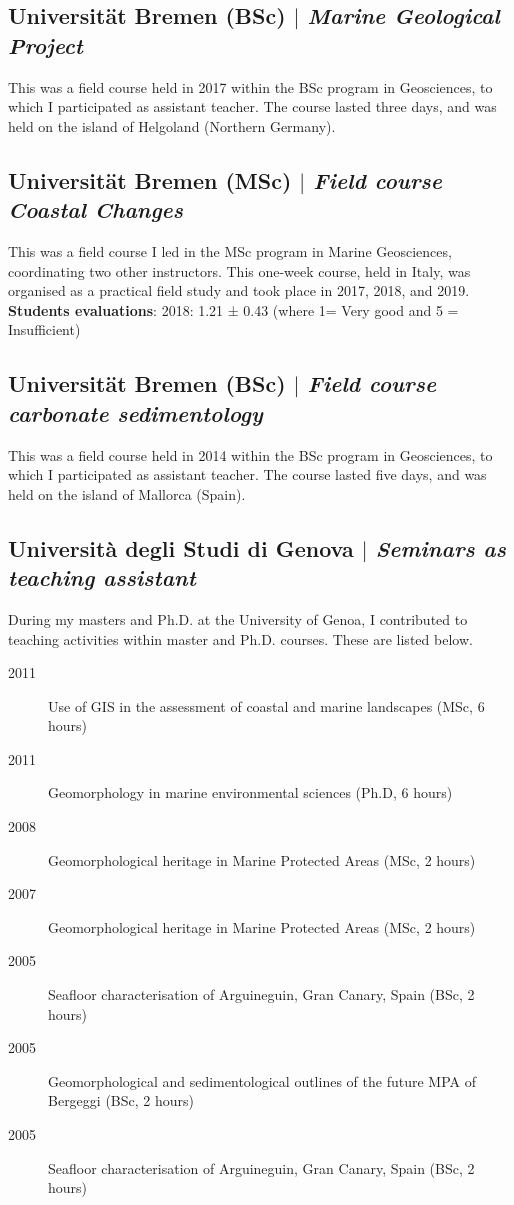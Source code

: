 \documentclass[11pt]{article}
\begin{document}
\subsection{Universität Bremen (BSc) $|$ {\normalfont\textit{Marine Geological Project}}}
{\footnotesize This was a field course held in 2017 within the BSc program in Geosciences, to which I participated as assistant teacher. The course lasted three days, and was held on the island of Helgoland (Northern Germany).}
\bigskip

\subsection{Universität Bremen (MSc) $|$ {\normalfont\textit{Field course Coastal Changes}}}
{\footnotesize This was a field course I led in the MSc program in Marine Geosciences, coordinating two other instructors. This one-week course, held in Italy, was organised as a practical field study and took place in 2017, 2018, and 2019.
\textbf{Students evaluations}: 2018: 1.21 ± 0.43 (where 1= Very good and 5 = Insufficient)}
\bigskip

\subsection{Universität Bremen (BSc) $|$ {\normalfont\textit{Field course carbonate sedimentology}}}
{\footnotesize This was a field course held in 2014 within the BSc program in Geosciences, to which I participated as assistant teacher. The course lasted five days, and was held on the island of Mallorca (Spain).}
\bigskip

\subsection{Università degli Studi di Genova $|$ {\normalfont\textit{Seminars as teaching assistant}}}
{\footnotesize During my masters and Ph.D. at the University of Genoa, I contributed to teaching activities within master and Ph.D. courses. These are listed below.}
{\footnotesize 
\begin{description}
  \item [2011] Use of GIS in the assessment of coastal and marine landscapes (MSc, 6 hours)
  \item [2011] Geomorphology in marine environmental sciences (Ph.D, 6 hours)
  \item [2008] Geomorphological heritage in Marine Protected Areas (MSc, 2 hours)
  \item [2007] Geomorphological heritage in Marine Protected Areas (MSc, 2 hours)
  \item [2005] Seafloor characterisation of Arguineguin, Gran Canary, Spain (BSc, 2 hours)
  \item [2005] Geomorphological and sedimentological outlines of the future MPA of Bergeggi (BSc, 2 hours)
  \item [2005] Seafloor characterisation of Arguineguin, Gran Canary, Spain (BSc, 2 hours)
\end{description}
}
\end{document}
